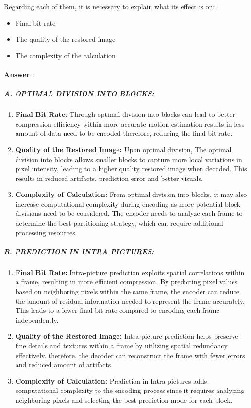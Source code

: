 \documentclass[letterpaper, 12pt]{article}
\begin{document}
Regarding each of them, it is necessary to explain what its effect is on:
\begin{itemize}
    \item Final bit rate
    \item The quality of the restored image
    \item The complexity of the calculation
\end{itemize}
\paragraph{Answer :\\} 

\subparagraph{A. OPTIMAL DIVISION INTO BLOCKS:}

\begin{enumerate}
    \item \textbf{Final Bit Rate:} Through optimal division into blocks can lead to better compression efficiency within more accurate motion estimation results in less amount of data need to be encoded therefore, reducing the final bit rate. 
    \item \textbf{Quality of the Restored Image:} Upon optimal division, The optimal division into blocks allows smaller blocks to capture more local variations in pixel intensity, leading to a higher quality restored image when decoded. This results in reduced artifacts, prediction error and better visuals.
    \item \textbf{Complexity of Calculation:} From optimal division into blocks, it may also increase computational complexity during encoding as more potential block divisions need to be considered. The encoder needs to analyze each frame to determine the best partitioning strategy, which can require additional processing resources.
\end{enumerate}

\subparagraph{B. PREDICTION IN INTRA PICTURES:}

\begin{enumerate}
    \item \textbf{Final Bit Rate:} Intra-picture prediction exploits spatial correlations within a frame, resulting in more efficient compression. By predicting pixel values based on neighboring pixels within the same frame, the encoder can reduce the amount of residual information needed to represent the frame accurately. This leads to a lower final bit rate compared to encoding each frame independently.
    \item \textbf{Quality of the Restored Image:} Intra-picture prediction helps preserve fine details and textures within a frame by utilizing spatial redundancy effectively. therefore, the decoder can reconstruct the frame with fewer errors and reduced amount of artifacts.
    \item \textbf{Complexity of Calculation:} Prediction in Intra-pictures adds computational complexity to the encoding process since it requires analyzing neighboring pixels and selecting the best prediction mode for each block. 
\end{enumerate}
\end{document}
